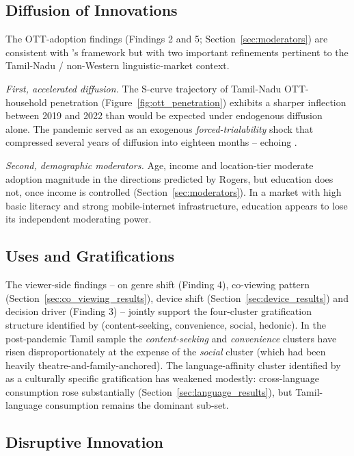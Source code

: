 \subsection{Diffusion of Innovations}

The OTT-adoption findings (Findings 2 and 5; Section~\ref{sec:moderators})
are consistent with \citet{rogers2003}'s framework but with two
important refinements pertinent to the Tamil-Nadu / non-Western
linguistic-market context.

\textit{First, accelerated diffusion.}  The S-curve trajectory of
Tamil-Nadu OTT-household penetration (Figure~\ref{fig:ott_penetration})
exhibits a sharper inflection between 2019 and 2022 than would be
expected under endogenous diffusion alone.  The pandemic served as
an exogenous \emph{forced-trialability} shock that compressed
several years of diffusion into eighteen months -- echoing
\citet{shukla2022,jaiswal2022}.

\textit{Second, demographic moderators.}  Age, income and
location-tier moderate adoption magnitude in the directions
predicted by Rogers, but education does not, once income is
controlled (Section~\ref{sec:moderators}).  In a market with high
basic literacy and strong mobile-internet infrastructure, education
appears to lose its independent moderating power.

\subsection{Uses and Gratifications}

The viewer-side findings -- on genre shift (Finding 4),
co-viewing pattern (Section~\ref{sec:co_viewing_results}), device
shift (Section~\ref{sec:device_results}) and decision driver (Finding 3)
-- jointly support the four-cluster gratification structure
identified by \citet{sundet2021,lotz2022,sundar2013} (content-seeking,
convenience, social, hedonic).  In the post-pandemic Tamil sample
the \emph{content-seeking} and \emph{convenience} clusters have
risen disproportionately at the expense of the \emph{social}
cluster (which had been heavily theatre-and-family-anchored).  The
language-affinity cluster identified by \citet{punathambekar2013,
nakassis2017} as a culturally specific gratification has weakened
modestly: cross-language consumption rose substantially
(Section~\ref{sec:language_results}), but Tamil-language consumption
remains the dominant sub-set.

\subsection{Disruptive Innovation}


